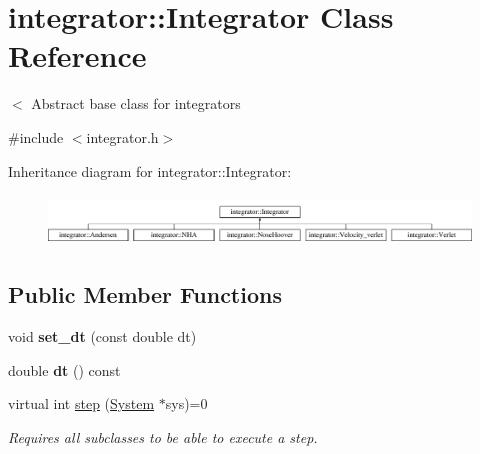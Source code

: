 \hypertarget{classintegrator_1_1Integrator}{\section{integrator\-:\-:Integrator Class Reference}
\label{classintegrator_1_1Integrator}
}


$<$ Abstract base class for integrators  




{\ttfamily \#include $<$integrator.\-h$>$}

Inheritance diagram for integrator\-:\-:Integrator\-:\begin{figure}[H]
\begin{center}
\leavevmode
\includegraphics[height=1.357576cm]{classintegrator_1_1Integrator}
\end{center}
\end{figure}
\subsection*{Public Member Functions}
\begin{DoxyCompactItemize}
\item 
\hypertarget{classintegrator_1_1Integrator_a95f47a72dd04720b119587d7b0644f0a}{void {\bfseries set\-\_\-dt} (const double dt)}\label{classintegrator_1_1Integrator_a95f47a72dd04720b119587d7b0644f0a}

\item 
\hypertarget{classintegrator_1_1Integrator_af1cddd15944a3f6ca2a8fbf93da02799}{double {\bfseries dt} () const }\label{classintegrator_1_1Integrator_af1cddd15944a3f6ca2a8fbf93da02799}

\item 
\hypertarget{classintegrator_1_1Integrator_a10a05ea2e4a2add5b14c08c33b34c3cb}{virtual int \hyperlink{classintegrator_1_1Integrator_a10a05ea2e4a2add5b14c08c33b34c3cb}{step} (\hyperlink{classsim__system_1_1System}{System} $\ast$sys)=0}\label{classintegrator_1_1Integrator_a10a05ea2e4a2add5b14c08c33b34c3cb}

\begin{DoxyCompactList}\small\item\em Requires all subclasses to be able to execute a step. \end{DoxyCompactList}\end{DoxyCompactItemize}
